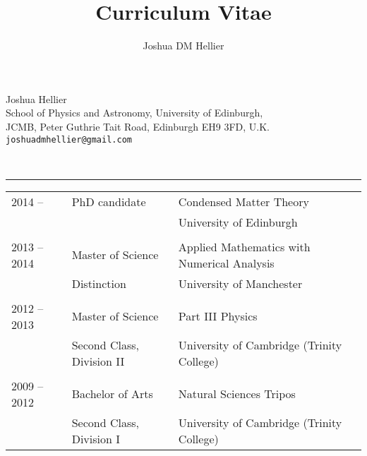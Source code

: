 \documentclass[a4paper,12pt]{article}
\title{Curriculum Vitae}
\author{Joshua DM Hellier}
\newenvironment{changemargin}[2]{%
\begin{list}{}{%
\setlength{\topsep}{0pt}%
\setlength{\leftmargin}{#1}%
\setlength{\rightmargin}{#2}%
\setlength{\listparindent}{\parindent}%
\setlength{\itemindent}{\parindent}%
\setlength{\parsep}{\parskip}%
}%
\item[]}{\end{list}}
\def\sec#1{\noindent {\bf #1} \\ \rule[10pt]{\linewidth}{1pt}}
\begin{document}
\begin{changemargin}{-2.0em}{-2.0em}

\centering
{\sc\huge Joshua Hellier} \\
\vspace{0.5em}
\small{
School of Physics and Astronomy, University of Edinburgh, \\
JCMB, Peter Guthrie Tait Road, Edinburgh EH9 3FD, U.K. \\
\texttt{joshuadmhellier@gmail.com}
}
\flushleft
\bigskip

\sec{Education}
\noindent
\begin{tabular}{p{0.17\linewidth}p{0.30\linewidth}p{0.53\linewidth}}
2014 --         & PhD candidate      & Condensed Matter Theory \\
                &           & University of Edinburgh \\
                \\
2013 -- 2014    & Master of Science     & Applied Mathematics with Numerical Analysis \\
      & Distinction  & University of Manchester \\
      \\
2012 -- 2013    & Master of Science    & Part III Physics \\
      & Second Class, Division II  & University of Cambridge (Trinity College) \\
      \\
2009 -- 2012    & Bachelor of Arts       & Natural Sciences Tripos \\
      & Second Class, Division I    & University of Cambridge (Trinity College) 
\end{tabular}
\bigskip


\end{changemargin}
\end{document}
